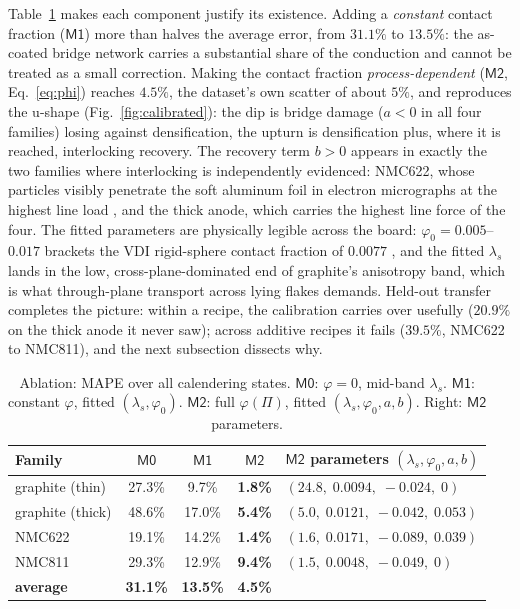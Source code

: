 \documentclass[10pt,a4paper]{article}
\newcommand{\lams}{\lambda_{s}}
\newcommand{\Mzero}{\ensuremath{\mathsf{M0}}}
\newcommand{\Mone}{\ensuremath{\mathsf{M1}}}
\newcommand{\Mtwo}{\ensuremath{\mathsf{M2}}}
\begin{document}
Table~\ref{tab:ablation} makes each component justify its existence. Adding a \emph{constant} contact fraction (\Mone) more than halves the average error, from $31.1\%$ to $13.5\%$: the as-coated bridge network carries a substantial share of the conduction and cannot be treated as a small correction. Making the contact fraction \emph{process-dependent} (\Mtwo, Eq.~\eqref{eq:phi}) reaches $4.5\%$, the dataset's own scatter of about $5\%$, and reproduces the u-shape (Fig.~\ref{fig:calibrated}): the dip is bridge damage ($a<0$ in all four families) losing against densification, the upturn is densification plus, where it is reached, interlocking recovery. The recovery term $b>0$ appears in exactly the two families where interlocking is independently evidenced: NMC622, whose particles visibly penetrate the soft aluminum foil in electron micrographs at the highest line load \cite{gandert2023}, and the thick anode, which carries the highest line force of the four. The fitted parameters are physically legible across the board: $\varphi_0=0.005$--$0.017$ brackets the VDI rigid-sphere contact fraction of $0.0077$ \cite{vdi}, and the fitted $\lams$ lands in the low, cross-plane-dominated end of graphite's anisotropy band, which is what through-plane transport across lying flakes demands. Held-out transfer completes the picture: within a recipe, the calibration carries over usefully ($20.9\%$ on the thick anode it never saw); across additive recipes it fails ($39.5\%$, NMC622 to NMC811), and the next subsection dissects why.

\begin{table}[tb]\centering\small
\caption{Ablation: MAPE over all calendering states. \Mzero: $\varphi=0$, mid-band $\lams$. \Mone: constant $\varphi$, fitted $(\lams,\varphi_0)$. \Mtwo: full $\varphi(\Pi)$, fitted $(\lams,\varphi_0,a,b)$. Right: \Mtwo{} parameters.}
\label{tab:ablation}
\begin{tabular}{lcccl}
\toprule
Family & \Mzero & \Mone & \Mtwo & \Mtwo{} parameters $(\lams,\varphi_0,a,b)$\\
\midrule
graphite (thin)  & 27.3\% & 9.7\%  & \textbf{1.8\%} & $(24.8,\;0.0094,\;-0.024,\;0)$\\
graphite (thick) & 48.6\% & 17.0\% & \textbf{5.4\%} & $(5.0,\;0.0121,\;-0.042,\;0.053)$\\
NMC622           & 19.1\% & 14.2\% & \textbf{1.4\%} & $(1.6,\;0.0171,\;-0.089,\;0.039)$\\
NMC811           & 29.3\% & 12.9\% & \textbf{9.4\%} & $(1.5,\;0.0048,\;-0.049,\;0)$\\
\midrule
\textbf{average} & \textbf{31.1\%} & \textbf{13.5\%} & \textbf{4.5\%} & \\
\bottomrule
\end{tabular}
\end{table}
\end{document}
